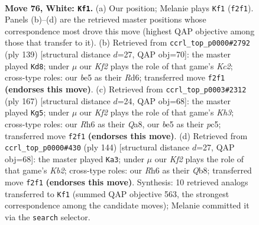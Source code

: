 \documentclass[11pt]{article}
\begin{document}
\clearpage

\begin{figure}[p]\centering
\begin{subfigure}{0.46\textwidth}\centering
\resizebox{\linewidth}{!}{%
\newchessgame
\chessboard[
  setfen={8/8/7R/4b3/8/1p1k1B2/1q3K2/8 w - - 8 76},
  showmover=false,
  pgfstyle=straightmove, color=movearrow, markmove={f2-f1}
]}
\caption{}
\end{subfigure}\hfill
\begin{subfigure}{0.46\textwidth}\centering
\resizebox{\linewidth}{!}{%
\newchessgame
\chessboard[
  setfen={8/2k3Q1/2br4/8/6P1/6K1/8/8 b - - 8 70},
  showmover=false,
  pgfstyle=straightmove, color=movearrow, markmove={c7-d8}
]}
\caption{}
\end{subfigure}
\\[4pt]
\begin{subfigure}{0.46\textwidth}\centering
\resizebox{\linewidth}{!}{%
\newchessgame
\chessboard[
  setfen={q7/8/3Q3k/2P4p/8/2K5/8/8 b - - 4 84},
  showmover=false,
  pgfstyle=straightmove, color=movearrow, markmove={h6-g5}
]}
\caption{}
\end{subfigure}\hfill
\begin{subfigure}{0.46\textwidth}\centering
\resizebox{\linewidth}{!}{%
\newchessgame
\chessboard[
  setfen={1Q6/5k2/5q2/8/8/7P/1KB5/8 w - - 23 73},
  showmover=false,
  pgfstyle=straightmove, color=movearrow, markmove={b2-a3}
]}
\caption{}
\end{subfigure}
\caption{\textbf{Move 76, White: \texttt{Kf1}.} (a) Our position; Melanie plays \texttt{Kf1} (\texttt{f2f1}). Panels (b)--(d) are the retrieved master positions whose correspondence most drove this move (highest QAP objective among those that transfer to it). (b) Retrieved from \texttt{ccrl\_top\_p0000\#2792} (ply 139) [structural distance $d$=27, QAP obj=70]: the master played \texttt{Kd8}; under $\mu$ our \emph{Kf2} plays the role of that game's \emph{Kc2}; cross-type roles: our \emph{b}e5 as their \emph{R}d6; transferred move \texttt{f2f1} \textbf{(endorses this move)}. (c) Retrieved from \texttt{ccrl\_top\_p0003\#2312} (ply 167) [structural distance $d$=24, QAP obj=68]: the master played \texttt{Kg5}; under $\mu$ our \emph{Kf2} plays the role of that game's \emph{Kh3}; cross-type roles: our \emph{R}h6 as their \emph{Q}a8, our \emph{b}e5 as their \emph{p}c5; transferred move \texttt{f2f1} \textbf{(endorses this move)}. (d) Retrieved from \texttt{ccrl\_top\_p0000\#430} (ply 144) [structural distance $d$=27, QAP obj=68]: the master played \texttt{Ka3}; under $\mu$ our \emph{Kf2} plays the role of that game's \emph{Kb2}; cross-type roles: our \emph{R}h6 as their \emph{Q}b8; transferred move \texttt{f2f1} \textbf{(endorses this move)}. Synthesis: 10 retrieved analogs transferred to \texttt{Kf1} (summed QAP objective 563, the strongest correspondence among the candidate moves); Melanie committed it via the \texttt{search} selector.}
\label{fig:thought-m150}
\end{figure}
\end{document}
